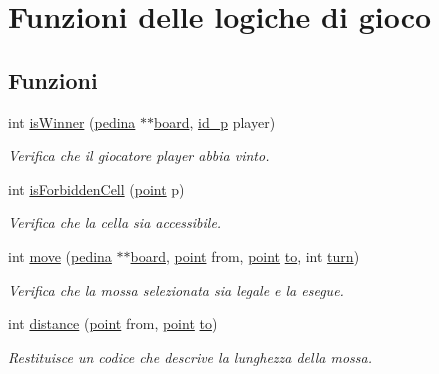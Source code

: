 \hypertarget{group__Logiche}{}\section{Funzioni delle logiche di gioco}
\label{group__Logiche}
\subsection*{Funzioni}
\begin{DoxyCompactItemize}
\item 
int \hyperlink{group__Logiche_ga0b5b57b74dd64318663e80224db22a29}{is\+Winner} (\hyperlink{ml__lib_8h_a71fee95122b31f5cb0b07d9c16ffa3a5}{pedina} $\ast$$\ast$\hyperlink{ml__main_8c_a62a3fe3d1df9ff58883b669f7f24e516}{board}, \hyperlink{ml__lib_8h_a0330ff92cbc796e96c3ce3e4401bf1e1}{id\+\_\+p} player)
\begin{DoxyCompactList}\small\item\em Verifica che il giocatore {\itshape player} abbia vinto. \end{DoxyCompactList}\item 
int \hyperlink{group__Logiche_ga8ca66b4e8b4e7f4511943aac8edde162}{is\+Forbidden\+Cell} (\hyperlink{structpunto}{point} p)
\begin{DoxyCompactList}\small\item\em Verifica che la cella sia accessibile. \end{DoxyCompactList}\item 
int \hyperlink{group__Logiche_ga86c0574f217b7d3616090c01365f4fe4}{move} (\hyperlink{ml__lib_8h_a71fee95122b31f5cb0b07d9c16ffa3a5}{pedina} $\ast$$\ast$\hyperlink{ml__main_8c_a62a3fe3d1df9ff58883b669f7f24e516}{board}, \hyperlink{structpunto}{point} from, \hyperlink{structpunto}{point} \hyperlink{ml__main_8c_a35ca515c701098a8cb38f9ef83404198}{to}, int \hyperlink{ml__main_8c_aaefa47f4fdf865c2358c22b542a993e4}{turn})
\begin{DoxyCompactList}\small\item\em Verifica che la mossa selezionata sia legale e la esegue. \end{DoxyCompactList}\item 
int \hyperlink{group__Logiche_gabcbd7b41508ab908b601d6607330190f}{distance} (\hyperlink{structpunto}{point} from, \hyperlink{structpunto}{point} \hyperlink{ml__main_8c_a35ca515c701098a8cb38f9ef83404198}{to})
\begin{DoxyCompactList}\small\item\em Restituisce un codice che descrive la lunghezza della mossa. \end{DoxyCompactList}\item 

\end{DoxyCompactItemize}
